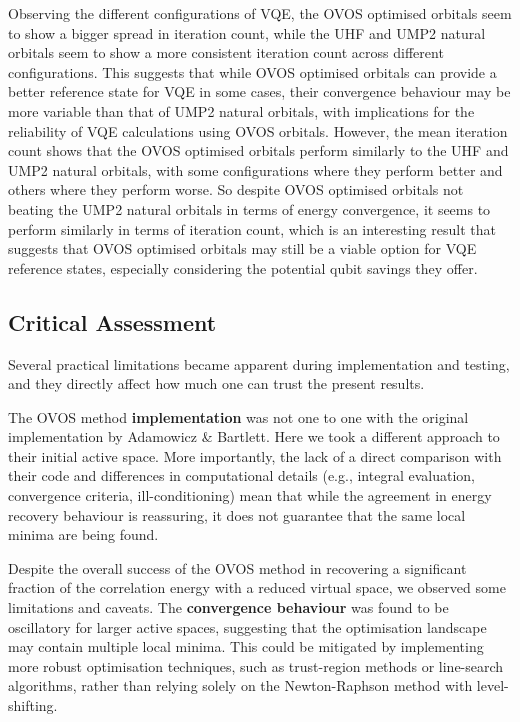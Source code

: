 Observing the different configurations of VQE, the OVOS optimised orbitals seem to show a bigger spread in iteration count, while the UHF and UMP2 natural orbitals seem to show a more consistent iteration count across different configurations. This suggests that while OVOS optimised orbitals can provide a better reference state for VQE in some cases, their convergence behaviour may be more variable than that of UMP2 natural orbitals, with implications for the reliability of VQE calculations using OVOS orbitals. However, the mean iteration count shows that the OVOS optimised orbitals perform similarly to the UHF and UMP2 natural orbitals, with some configurations where they perform better and others where they perform worse. So despite OVOS optimised orbitals not beating the UMP2 natural orbitals in terms of energy convergence, it seems to perform similarly in terms of iteration count, which is an interesting result that suggests that OVOS optimised orbitals may still be a viable option for VQE reference states, especially considering the potential qubit savings they offer.

\subsection{Critical Assessment}

Several practical limitations became apparent during implementation and testing, and they directly affect how much one can trust the present results.

The OVOS method \textbf{implementation} was not one to one with the original implementation by Adamowicz \& Bartlett. Here we took a different approach to their initial active space. More importantly, the lack of a direct comparison with their code and differences in computational details (e.g., integral evaluation, convergence criteria, ill-conditioning) mean that while the agreement in energy recovery behaviour is reassuring, it does not guarantee that the same local minima are being found. 

Despite the overall success of the OVOS method in recovering a significant fraction of the correlation energy with a reduced virtual space, we observed some limitations and caveats. The \textbf{convergence behaviour} was found to be oscillatory for larger active spaces, suggesting that the optimisation landscape may contain multiple local minima. This could be mitigated by implementing more robust optimisation techniques, such as trust-region methods or line-search algorithms, rather than relying solely on the Newton-Raphson method with level-shifting. 

